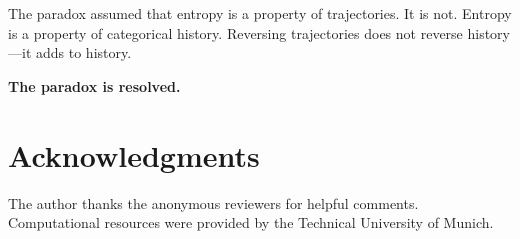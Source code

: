 \documentclass[twocolumn,10pt]{article}
\theoremstyle{definition}
\theoremstyle{remark}
\begin{document}
The paradox assumed that entropy is a property of trajectories. It is not. Entropy is a property of categorical history. Reversing trajectories does not reverse history---it adds to history.

\textbf{The paradox is resolved.}

\section*{Acknowledgments}

The author thanks the anonymous reviewers for helpful comments. Computational resources were provided by the Technical University of Munich.




\end{document}
